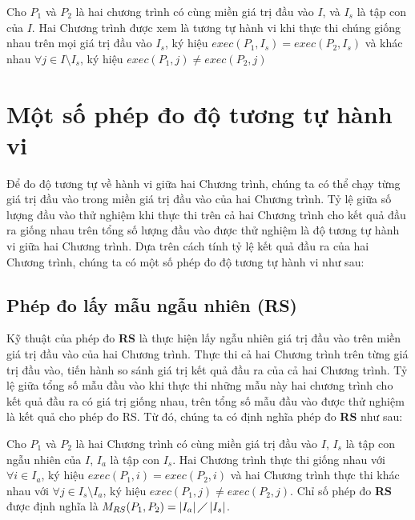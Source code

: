 \begin{definition}
Cho $P_{1}$ và $P_{2}$ là hai chương trình có cùng miền giá trị đầu vào $I$, và $I_{s}$ là tập con của $I$. Hai Chương trình được xem là tương tự hành vi khi thực thi chúng giống nhau trên mọi giá trị đầu vào $I_{s}$, ký hiệu  $exec(P_{1}, I_{s}) = exec(P_{2}, I_{s})$ và khác nhau $\forall j \in I \setminus I_{s}$, ký hiệu $exec(P_{1}, j) \neq exec(P_{2}, j)$
\end{definition}

\section{Một số phép đo độ tương tự hành vi}
Để đo độ tương tự về hành vi giữa hai Chương trình, chúng ta có thể chạy từng giá trị đầu vào trong miền giá trị đầu vào của hai Chương trình. Tỷ lệ giữa số lượng đầu vào thử nghiệm khi thực thi trên cả hai Chương trình cho kết quả đầu ra giống nhau trên tổng số lượng đầu vào được thử nghiệm là độ tương tự hành vi giữa hai Chương trình. Dựa trên cách tính tỷ lệ kết quả đầu ra của hai Chương trình, chúng ta có một số phép đo độ tương tự hành vi như sau:

\subsection{Phép đo lấy mẫu ngẫu nhiên (RS)}
Kỹ thuật của phép đo \textbf{RS} là thực hiện lấy ngẫu nhiên giá trị đầu vào trên miền giá trị đầu vào của hai Chương trình. Thực thi cả hai Chương trình trên từng giá trị đầu vào, tiến hành so sánh giá trị kết quả đầu ra của cả hai Chương trình. Tỷ lệ giữa tổng số mẫu đầu vào khi thực thi những mẫu này hai chương trình cho kết quả đầu ra có giá trị giống nhau, trên tổng số mẫu đầu vào được thử nghiệm là kết quả cho phép đo RS. Từ đó, chúng ta có định nghĩa phép đo \textbf{RS} như sau:

\begin{definition}[Phép đo RS]
	Cho $P_{1}$ và $P_{2}$ là hai Chương trình có cùng miền giá trị đầu vào $I$, $I_{s}$ là tập con ngẫu nhiên của $I$, $I_{a}$ là tập con $I_{s}$. Hai Chương trình thực thi giống nhau với $\forall i \in I_{a}$, ký hiệu $exec(P_{1}, i) = exec(P_{2}, i)$ và hai Chương trình thực thi khác nhau với $\forall j \in I_{s} \setminus I_{a}$, ký hiệu $exec(P_{1}, j) \neq exec(P_{2}, j)$. Chỉ số phép đo \textbf{RS} được định nghĩa là $M_{RS}(P_{1}, P_{2}) = \left|I_{a}\right| \diagup \left|I_{s}\right| $.
\end{definition}

